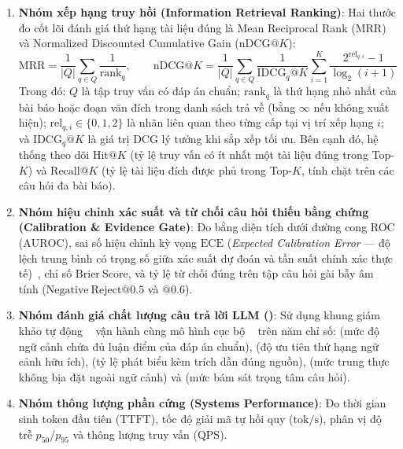 \begin{enumerate}[label=\textbf{\arabic*.}]
  \item \textbf{Nhóm xếp hạng truy hồi (Information Retrieval Ranking)}: Hai thước đo cốt lõi đánh giá thứ hạng tài liệu đúng là Mean Reciprocal Rank ($\mathrm{MRR}$) và Normalized Discounted Cumulative Gain ($\mathrm{nDCG}@K$):
  \begin{equation}
    \mathrm{MRR} = \frac{1}{|Q|} \sum_{q \in Q} \frac{1}{\mathrm{rank}_q}, \qquad \mathrm{nDCG}@K = \frac{1}{|Q|} \sum_{q \in Q} \frac{1}{\mathrm{IDCG}_q@K} \sum_{i=1}^{K} \frac{2^{\mathrm{rel}_{q,i}} - 1}{\log_2(i + 1)}
    \label{eq:ch5_mrr_ndcg}
  \end{equation}
  Trong đó: $Q$ là tập truy vấn có đáp án chuẩn; $\mathrm{rank}_q$ là thứ hạng nhỏ nhất của bài báo hoặc đoạn văn đích trong danh sách trả về (bằng $\infty$ nếu không xuất hiện); $\mathrm{rel}_{q,i} \in \{0, 1, 2\}$ là nhãn liên quan theo từng cấp tại vị trí xếp hạng $i$; và $\mathrm{IDCG}_q@K$ là giá trị DCG lý tưởng khi sắp xếp tối ưu. Bên cạnh đó, hệ thống theo dõi $\mathrm{Hit}@K$ (tỷ lệ truy vấn có ít nhất một tài liệu đúng trong Top-$K$) và $\mathrm{Recall}@K$ (tỷ lệ tài liệu đích được phủ trong Top-$K$, tính chặt trên các câu hỏi đa bài báo).

  \item \textbf{Nhóm hiệu chỉnh xác suất và từ chối câu hỏi thiếu bằng chứng (Calibration \& Evidence Gate)}: Đo bằng diện tích dưới đường cong ROC ($\mathrm{AUROC}$), sai số hiệu chỉnh kỳ vọng $\mathrm{ECE}$ (\textit{Expected Calibration Error} --- độ lệch trung bình có trọng số giữa xác suất dự đoán và tần suất chính xác thực tế)~\cite{guo2017calibration}, chỉ số $\mathrm{Brier\ Score}$, và tỷ lệ từ chối đúng trên tập câu hỏi gài bẫy âm tính ($\mathrm{Negative\ Reject}@0.5$ và $@0.6$).

  \item \textbf{Nhóm đánh giá chất lượng câu trả lời LLM ()}: Sử dụng khung giám khảo tự động ~\cite{deepeval2024confident} vận hành cùng mô hình cục bộ ~\cite{qwen25report2024} trên năm chỉ số:  (mức độ ngữ cảnh chứa đủ luận điểm của đáp án chuẩn),  (độ ưu tiên thứ hạng ngữ cảnh hữu ích),  (tỷ lệ phát biểu kèm trích dẫn đúng nguồn),  (mức trung thực không bịa đặt ngoài ngữ cảnh) và  (mức bám sát trọng tâm câu hỏi).

  \item \textbf{Nhóm thông lượng phần cứng (Systems Performance)}: Đo thời gian sinh token đầu tiên ($\mathrm{TTFT}$), tốc độ giải mã tự hồi quy ($\mathrm{tok/s}$), phân vị độ trễ $p_{50}$/$p_{95}$ và thông lượng truy vấn ($\mathrm{QPS}$).
\end{enumerate}

